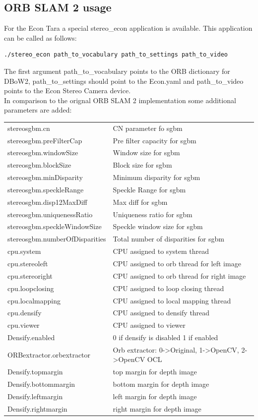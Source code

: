 \documentclass[11pt,a4paper,titlepage,oneside]{report}
\begin{document}
\subsection{ORB SLAM 2 usage}

For the Econ Tara a special stereo\_econ application is available. This application can be called as follows:
\begin{lstlisting}[language=bash]
./stereo_econ path_to_vocabulary path_to_settings path_to_video
\end{lstlisting}

The first argument path\_to\_vocabulary points to the ORB dictionary for DBoW2, path\_to\_settings should point to the Econ.yaml and path\_to\_video points to the Econ Stereo Camera device.\\
In comparison to the orignal ORB SLAM 2 implementation some additional parameters are added:\\
\begin{tabular}{l l}
stereosgbm.cn & CN parameter fo sgbm \\
stereosgbm.preFilterCap & Pre filter capacity for sgbm \\
stereosgbm.windowSize & Window size for sgbm \\
stereosgbm.blockSize & Block size for sgbm \\
stereosgbm.minDisparity & Minimum disparity for sgbm \\
stereosgbm.speckleRange &  Speckle Range for sgbm \\
stereosgbm.disp12MaxDiff & Max diff for sgbm \\
stereosgbm.uniquenessRatio & Uniqueness ratio for sgbm \\
stereosgbm.speckleWindowSize & Speckle window size for sgbm \\
stereosgbm.numberOfDisparities & Total number of disparities for sgbm \\
cpu.system & CPU assigned to system thread \\
cpu.stereoleft & CPU assigned to orb thread for left image \\
cpu.stereoright & CPU assigned to orb thread for right image \\
cpu.loopclosing & CPU assigned to loop closing thread \\
cpu.localmapping & CPU assigned to local mapping thread \\
cpu.densify & CPU assigned to densify thread \\
cpu.viewer & CPU assigned to viewer \\
Densify.enabled & 0 if densify is disabled 1 if enabled \\
ORBextractor.orbextractor & Orb extractor: 0->Original, 1->OpenCV, 2->OpenCV OCL \\
Densify.topmargin & top margin for depth image \\
Densify.bottommargin & bottom margin for depth image \\
Densify.leftmargin & left margin for depth image \\
Densify.rightmargin & right margin for depth image \\
\end{tabular}\\
\end{document}

